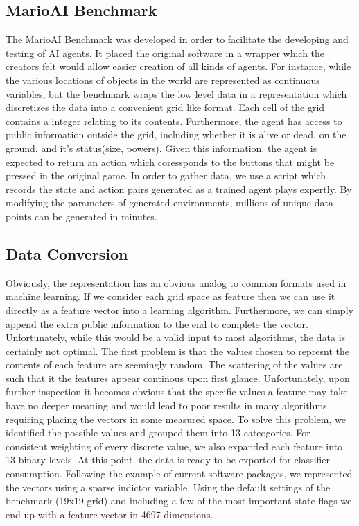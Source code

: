 \documentclass[]{article}   %
\begin{document}
\subsection{MarioAI Benchmark}
The MarioAI Benchmark \cite{mariobenchmark} was developed in order to facilitate the developing and testing of AI agents.  It placed the original software in a wrapper which the creators felt would allow easier creation of all kinds of agents.  For instance, while the various locations of objects in the world are represented as continuous variables, but the benchmark wraps the low level data in a representation which discretizes the data into a convenient grid like format.  Each cell of the grid contains a integer relating to its contents.  Furthermore, the agent has access to public information outside the grid, including whether it is alive or dead, on the ground, and it's status(size, powers).  Given this information, the agent is expected to return an action which coressponds to the buttons that might be pressed in the original game.  In order to gather data, we use a script which records the state and action pairs generated as a trained agent plays expertly.  By modifying the parameters of generated environments, millions of unique data points can be generated in minutes.
\subsection{Data Conversion}
Obviously, the representation has an obvious analog to common formats used in machine learning.  If we consider each grid space as feature then we can use it directly as a feature vector into a learning algorithm.  Furthermore, we can simply append the extra public information to the end to complete the vector.  Unfortunately, while this would be a valid input to most algorithms, the data is certainly not optimal.
\newline\newline
The first problem is that the values chosen to represnt the contents of each feature are seemingly random.  The scattering of the values are such that it the features appear continous upon first glance.  Unfortunately, upon further inspection it becomes obvious that the specific values a feature may take have no deeper meaning and would lead to poor results in many algorithms requiring placing the vectors in some measured space.  To solve this problem, we identified the possible values and grouped them into 13 cateogories.  For consistent weighting of every discrete value, we also expanded each feature into 13 binary levels.  At this point, the data is ready to be exported for classifier consumption.  Following the example of current software packages, we represented the vectors using a sparse indictor variable.  Using the default settings of the benchmark (19x19 grid) and including a few of the most important state flags we end up with a feature vector in 4697 dimensions.
\end{document}

